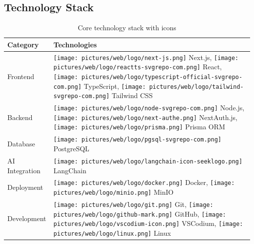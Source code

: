 \subsection{Technology Stack}

\begin{table}[h!]
    \centering
    \begin{tabular}{|p{3cm}|p{8cm}|}
        \hline
        \textbf{Category} & \textbf{Technologies} \\ \hline
        
         Frontend & 
        \texttt{[image: pictures/web/logo/next-js.png]} Next.js, 
        \texttt{[image: pictures/web/logo/reactts-svgrepo-com.png]} React, 
        \texttt{[image: pictures/web/logo/typescript-official-svgrepo-com.png]} TypeScript, \newline
        \texttt{[image: pictures/web/logo/tailwind-svgrepo-com.png]} Tailwind CSS \\ \hline
        
         Backend & 
        \texttt{[image: pictures/web/logo/node-svgrepo-com.png]} Node.js, 
        \texttt{[image: pictures/web/logo/next-authe.png]} NextAuth.js, \newline
        \texttt{[image: pictures/web/logo/prisma.png]} Prisma ORM \\ \hline
        
         Database & 
        \texttt{[image: pictures/web/logo/pgsql-svgrepo-com.png]} PostgreSQL \\ \hline
        
         AI Integration & 
        \texttt{[image: pictures/web/logo/langchain-icon-seeklogo.png]} LangChain \\ \hline
        
         Deployment & 
        \texttt{[image: pictures/web/logo/docker.png]} Docker, 
        \texttt{[image: pictures/web/logo/minio.png]} MinIO \\ \hline
        
         Development & 
        \texttt{[image: pictures/web/logo/git.png]} Git, 
        \texttt{[image: pictures/web/logo/github-mark.png]} GitHub, 
        \texttt{[image: pictures/web/logo/vscodium-icon.png]} VSCodium, \newline
        \texttt{[image: pictures/web/logo/linux.png]} Linux \\ \hline
    \end{tabular}
    \caption{Core technology stack with icons}
\end{table}

